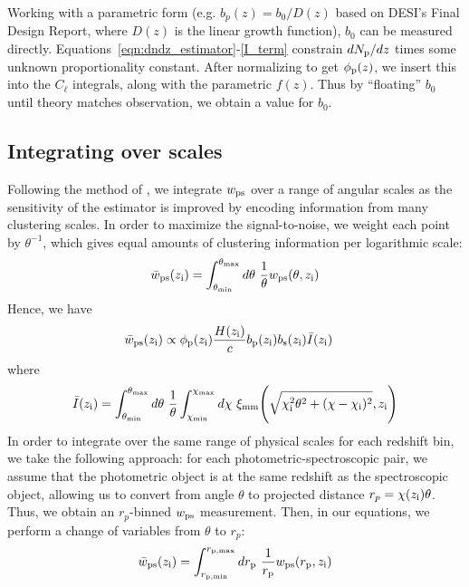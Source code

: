 \documentclass[a4paper,usenatbib]{mnras}
\begin{document}
Working with a parametric form (e.g. $b_p(z) = b_0 / D(z)$ based on DESI's Final Design Report, where $D(z)$ is the linear growth function), $b_0$ can be measured directly. Equations~\ref{eqn:dndz_estimator}-\ref{I_term} constrain $dN_{\rm p}/dz$ times some unknown proportionality constant. After normalizing to get $\phi_{\rm p}(z)$, we insert this into the $C_{\ell}$ integrals, along with the parametric $f(z)$. Thus by ``floating'' $b_0$ until theory matches observation, we obtain a value for $b_0$.

\subsection{Integrating over scales}

Following the method of \citealt{Menard13}, we integrate $w_{\rm ps}$ over a range of angular scales as the sensitivity of the estimator is improved by encoding information from many clustering scales. In order to maximize the signal-to-noise, we weight each point by $\theta^{-1}$, which gives equal amounts of clustering information per logarithmic scale: 
\begin{align}
    \bar{w}_{\rm ps}(z_{\rm i}) = \int_{\theta_{\rm min}}^{\theta_{\rm max}}d\theta \ \frac{1}{\theta} w_{\rm ps}(\theta, z_{\rm i})
\end{align}
%
Hence, we have
\begin{align}
    \bar{w}_{\rm ps}(z_{\rm i}) &\propto \phi_{\rm p}(z_{\rm i})\frac{H(z_{\rm i})}{c}b_{\rm p}(z_{\rm i})b_{\rm s}(z_{\rm i})\bar{I}(z_{\rm i})
\end{align}
where
\begin{equation}\label{Ibar}
    \bar{I}(z_{\rm i}) = \int_{\theta_{\rm min}}^{\theta_{\rm max}}d\theta \ \frac{1}{\theta} \int_{\chi_{\rm min}}^{\chi_{\rm max}}d\chi \ \xi_{\rm mm}{\Bigg (}\sqrt{\chi_{\rm i}^2\theta^2 + (\chi-\chi_{\rm i})^2},z_{\rm i}{\Bigg )}
\end{equation}
In order to integrate over the same range of physical scales for each redshift bin, we take the following approach: for each photometric-spectroscopic pair, we assume that the photometric object is at the same redshift as the spectroscopic object, allowing us to convert from angle $\theta$ to projected distance $r_p = \chi(z_{\rm i})\theta$. Thus, we obtain an $r_p$-binned $w_{\rm ps}$ measurement. Then, in our equations, we perform a change of variables from $\theta$ to $r_p$:
\begin{align}
    \bar{w}_{\rm ps}(z_{\rm i}) = \int_{r_{\rm p, min}}^{r_{\rm p, max}}dr_{\rm p} \ \frac{1}{r_{\rm p}} w_{\rm ps}(r_{\rm p}, z_{\rm i})
\end{align}
\end{document}
